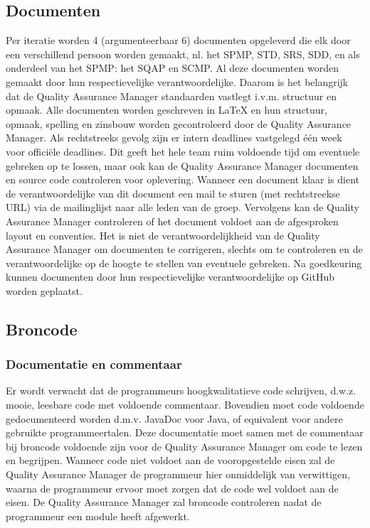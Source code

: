 \subsection{Documenten}
Per iteratie worden 4 (argumenteerbaar 6) documenten opgeleverd die elk door een verschillend persoon worden gemaakt, nl. het SPMP, STD, SRS, SDD, en als onderdeel van het SPMP: het SQAP en SCMP. Al deze documenten worden gemaakt door hun respectievelijke verantwoordelijke. Daarom is het belangrijk dat de Quality Assurance Manager standaarden vastlegt i.v.m. structuur en opmaak. Alle documenten worden geschreven in LaTeX en hun structuur, opmaak, spelling en zinsbouw worden gecontroleerd door de Quality Assurance Manager. Als rechtstreeks gevolg zijn er intern deadlines vastgelegd één week voor officiële deadlines. Dit geeft het hele team ruim voldoende tijd om eventuele gebreken op te lossen, maar ook kan de Quality Assurance Manager documenten en source code controleren voor oplevering. Wanneer een document klaar is dient de verantwoordelijke van dit document een mail te sturen (met rechtstreekse URL) via de mailinglijst naar alle leden van de groep. Vervolgens kan de Quality Assurance Manager controleren of het document voldoet aan de afgesproken layout en conventies. Het is niet de verantwoordelijkheid van de Quality Assurance Manager om documenten te corrigeren, slechts om te controleren en de verantwoordelijke op de hoogte te stellen van eventuele gebreken. Na goedkeuring kunnen documenten door hun respectievelijke verantwoordelijke op GitHub worden geplaatst.

\subsection{Broncode}
\subsubsection{Documentatie en commentaar}
Er wordt verwacht dat de programmeurs hoogkwalitatieve code schrijven, d.w.z. mooie, leesbare code met voldoende commentaar. Bovendien moet code voldoende gedocumenteerd worden d.m.v. JavaDoc voor Java, of equivalent voor andere gebruikte programmeertalen. Deze documentatie moet samen met de commentaar bij broncode voldoende zijn voor de Quality Assurance Manager om code te lezen en begrijpen. Wanneer code niet voldoet aan de vooropgestelde eisen zal de Quality Assurance Manager de programmeur hier onmiddelijk van verwittigen, waarna de programmeur ervoor moet zorgen dat de code wel voldoet aan de eisen. De Quality Assurance Manager zal broncode controleren nadat de programmeur een module heeft afgewerkt. 


